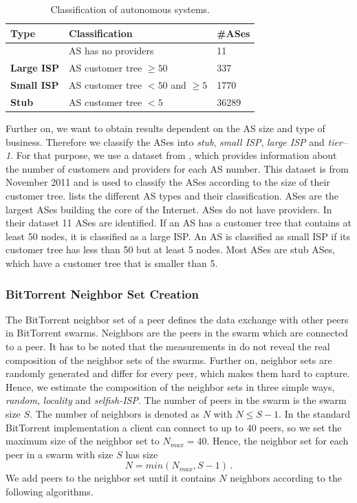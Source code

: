 \begin{table}[tb]
\caption{Classification of autonomous systems.} \label{tab:ASclass}
\begin{center}
{\footnotesize
	\begin{tabular}{|l|l|l|} \hline
		\textbf{Type} & \textbf{Classification} & \textbf{\#ASes} \\ \hline
		\textbf{\Tier} & AS has no providers & 11 \\ \hline
		\textbf{Large ISP} & AS customer tree $\geq50$ & 337 \\ \hline
		\textbf{Small ISP} & AS customer tree $<50$ and $\geq5$ & 1770 \\ \hline
		\textbf{Stub} & AS customer tree $<5$ & 36289 \\ \hline
	\end{tabular}
}
\end{center}
\end{table}

Further on, we want to obtain results dependent on the AS size and type of business. Therefore we classify the ASes into \textit{stub}, \textit{small ISP}, \textit{large ISP} and \textit{tier--1}. For that purpose, we use a dataset from \cite{irlas}, which provides information about the number of customers and providers for each AS number. This dataset is from November 2011 and is used to classify the ASes according to the size of their customer tree.
 lists the different AS types and their classification. \Tier ASes are the largest ASes building the core of the Internet. \Tier ASes do not have providers. In their dataset 11 \tier ASes are identified. If an AS has a customer tree that contains at least 50 nodes, it is classified as a large ISP. An AS is classified as small ISP if its customer tree has less than 50 but at least 5 nodes. Most ASes are stub ASes, which have a customer tree that is smaller than 5.

\subsubsection{BitTorrent Neighbor Set Creation}

The BitTorrent neighbor set of a peer defines the data exchange with other peers in BitTorrent swarms. Neighbors are the peers in the swarm which are connected to a peer. It has to be noted that the measurements in \cite{Hossfeld2011} do not reveal the real composition of the neighbor sets of the swarms. Further on, neighbor sets are randomly generated and differ for every peer, which makes them hard to capture. Hence, we estimate the composition of the neighbor sets in three simple ways, \textit{random}, \textit{locality} and \textit{selfish-ISP}.
The number of peers in the swarm is the swarm size $S$. The number of neighbors is denoted as $N$ with $N\leq S-1$. In the standard BitTorrent implementation a client can connect to up to 40 peers, so we set the maximum size of the neighbor set to $N_{max}=40$. Hence, the neighbor set for each peer in a swarm with size $S$ has size
\begin{equation}
N=min(N_{max},S-1) \, .
\end{equation}
We add peers to the neighbor set until it contains $N$ neighbors according to the following algorithms.
